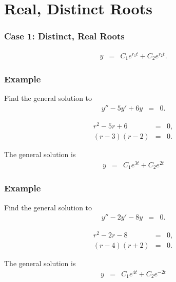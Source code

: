 \section{Real, Distinct Roots}

\begin{frame}
  \frametitle{Case 1: Distinct, Real Roots}

  \begin{eqnarray*}
    y & = & C_1 e^{r_1 t} + C_2 e^{r_2 t}.
  \end{eqnarray*}

\end{frame}


\begin{frame}
  \frametitle{Example}

  Find the general solution to
  \begin{eqnarray*}
    y'' - 5y' + 6y & = & 0.
  \end{eqnarray*}

  {
    \begin{eqnarray*}
      r^2 - 5r + 6 & = & 0, \\
      (r-3)(r-2) & = & 0.
    \end{eqnarray*}

    The general solution is
    \begin{eqnarray*}
      y & = & C_1 e^{3t} + C_2 e^{2t}
    \end{eqnarray*}

  }

\end{frame}


\begin{frame}
  \frametitle{Example}

  Find the general solution to
  \begin{eqnarray*}
    y'' - 2y' - 8y & = & 0.
  \end{eqnarray*}

  {
    \begin{eqnarray*}
      r^2 - 2r - 8 & = & 0, \\
      (r-4)(r+2) & = & 0.
    \end{eqnarray*}

    The general solution is
    \begin{eqnarray*}
      y & = & C_1 e^{4t} + C_2 e^{-2t}
    \end{eqnarray*}

  }

\end{frame}


